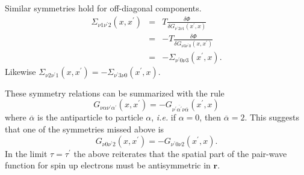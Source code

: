 Similar symmetries hold for off-diagonal components.
\begin{eqnarray}
\Sigma_{\nu 1 \nu^{\prime}2}(x,x^{\prime}) & = & T \frac{\delta \Phi}
{\delta G_{\nu^{\prime}2 \nu 1}(x^{\prime},x)} \\
& = & -T \frac{\delta \Phi}{\delta G_{\nu 3 \nu^{\prime}0}(x,x^{\prime})} \\
& = & -\Sigma_{\nu^{\prime} 0 \nu 3}(x^{\prime},x).
\end{eqnarray}
Likewise $\Sigma_{\nu 2 \nu^{\prime}1}(x,x^{\prime})  
=  -\Sigma_{\nu^{\prime}3 \nu 0}(x^{\prime},x)$.

These symmetry relations can be summarized with the rule
\begin{equation}
G_{\nu\alpha\nu^{\prime}\alpha^{\prime}}(x,x^{\prime}) = 
-G_{\nu^{\prime}\overline{\alpha^{\prime}}\nu\overline{\alpha}}(x^{\prime},x)
\end{equation}
where $\overline{\alpha}$ is the antiparticle to
particle $\alpha$, \textit{i.e.} if $\alpha = 0$, then
$\overline{\alpha} = 2$.  This suggests that one of
the symmetries missed above is
\begin{equation}
G_{\nu 0 \nu^{\prime}2}(x,x^{\prime}) = -G_{\nu^{\prime}0 \nu 2}(x^{\prime},x).
\end{equation}
In the limit $\tau = \tau^{\prime}$ the above reiterates
that the spatial part of the pair-wave function for spin
up electrons must be antisymmetric in $\mathbf{r}$.

